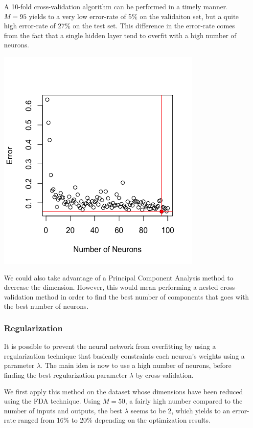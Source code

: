 \documentclass[]{report}
\begin{document}
A 10-fold cross-validation algorithm can be performed in a timely manner. $M = 95$ yields to a very low error-rate of 5\% on the validaiton set, but a quite high error-rate of 27\% on the test set. This difference in the error-rate comes from the fact that a single hidden layer tend to overfit with a high number of neurons.

\begin{center}
	\includegraphics[width=0.6\linewidth]{Figures/nnet_fda_cv.png}
	\label{fig:nnet_fda_cv}
\end{center}

We could also take advantage of a Principal Component Analysis method to decrease the dimension. However, this would mean performing a nested cross-validation method in order to find the best number of components that goes with the best number of neurons.

\subsubsection{Regularization}
 It is possible to prevent the neural network from overfitting by using a regularization technique that basically constraints each neuron's weights using a parameter $\lambda$. The main idea is now to use a high number of neurons, before finding the best regularization parameter  $\lambda$ by cross-validation.
 
 We first apply this method on the dataset whose dimensions have been reduced using the FDA technique. Using $M = 50$, a fairly high number compared to the number of inputs and outputs, the best $\lambda$ seems to be 2, which yields to an error-rate ranged from 16\% to 20\% depending on the optimization results.
 
\end{document}
